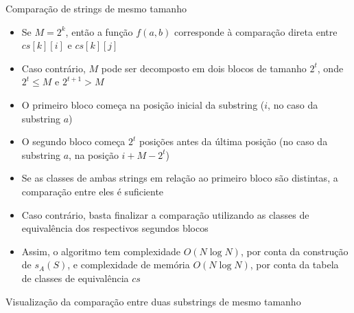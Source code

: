 \begin{frame}[fragile]{Comparação de strings de mesmo tamanho}

    \begin{itemize}
        \item Se $M = 2^k$, então a função $f(a, b)$ corresponde à comparação direta entre
            $cs[k][i]$ e $cs[k][j]$

        \item Caso contrário, $M$ pode ser decomposto em dois blocos de tamanho $2^t$, onde
            $2^t \leq M$ e $2^{t + 1} > M$

        \item O primeiro bloco começa na posição inicial da substring ($i$, no caso da substring
            $a$)

        \item O segundo bloco começa $2^t$ posições antes da última posição (no caso da substring
            $a$, na posição $i + M - 2^t$)

        \item Se as classes de ambas strings em relação ao primeiro bloco são distintas, 
            a comparação entre eles é suficiente

        \item Caso contrário, basta finalizar a comparação utilizando as classes de equivalência
            dos respectivos segundos blocos

        \item Assim, o algoritmo tem complexidade $O(N\log N)$, por conta da construção de 
            $s_A(S)$, e complexidade de memória $O(N\log N)$, por conta da tabela de classes
            de equivalência $cs$
    \end{itemize}

\end{frame}

\begin{frame}[fragile]{Visualização da comparação entre duas substrings de mesmo tamanho}

    \begin{figure}
        \centering


    \end{figure}

\end{frame}

